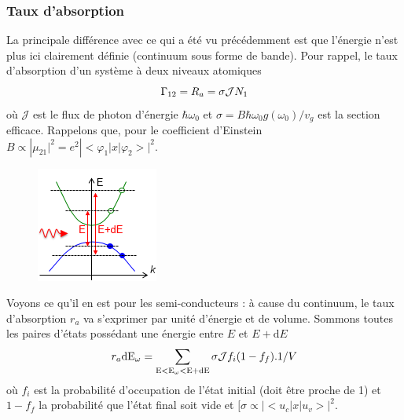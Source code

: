 		\subsubsection{Taux d'absorption}
		La principale différence avec ce qui a été vu précédemment est que l'énergie n'est plus 
		ici clairement définie (continuum sous forme de bande). Pour rappel, le taux d'absorption
		d'un système à deux niveaux atomiques 
		\begin{equation}
		{\Gamma _{12}} = {R_a} = \sigma {{\cal J}}{N_1}
		\end{equation}
		où $\mathcal{J}$ est le flux de photon d'énergie $\hbar\omega_0$ et $\sigma = 
		B\hbar {\omega _0}g({\omega _0})/{v_g}$ est la section efficace. Rappelons que, pour le 
		coefficient d'Einstein $B \propto |{\mu _{21}}{|^2} = {e^2}| < {\varphi _1}|x|{\varphi _2} >
		 {|^2}$.\\

		\begin{figure}
		\vspace{-5mm}
		\includegraphics[scale=0.85]{ch5/image17}
		\end{figure}		 
		Voyons ce qu'il en est pour les semi-conducteurs : à cause du continuum, le taux d'absorption 
		$r_a$ va s'exprimer par unité d'énergie et de volume. Sommons toutes les paires d'états 
		possédant une énergie entre $E$ et $E+\text{d}E$ 
		\begin{equation}
		{r_a}{\rm{d}}{{\rm{E}}_\omega } = \sum\limits_{{\rm{E < }}{{\rm{E}}_\omega } < {\rm{E + dE}}}
		 {\sigma {{\cal J}}} {f_i}(1 - {f_f}).1/V
		\end{equation}				 
		où $f_i$ est la probabilité d'occupation de l'état initial (doit être proche de 1) et 
		$1-f_f$ la probabilité que l'état final soit vide et $[\sigma  \propto | < {u_c}|x|{u_v} > 
		{|^2}$.\ \\
		
